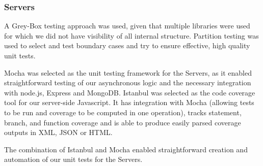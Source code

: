 \documentclass[a4paper,11pt]{article}
\begin{document}
\clearpage
\subsubsection{Servers}




A Grey-Box testing approach was used, given that multiple libraries were used for which we did not have visibility of all internal structure. Partition testing was used to select and test boundary cases and try to ensure effective, high quality unit tests.

Mocha \cite{mocha} was selected as the unit testing framework for the Servers, as it enabled straightforward testing of our asynchronous logic and the necessary integration with node.js, Express and MongoDB. 
Istanbul \cite{istanbul} was selected as the code coverage tool for our server-side Javascript. It has integration with Mocha (allowing tests to be run and coverage to be computed in one operation), tracks statement, branch, and function coverage and is able to produce easily parsed coverage outputs in XML, JSON or HTML. 

The combination of Istanbul and Mocha enabled straightforward creation and automation of our unit tests for the Servers.

\end{document}
